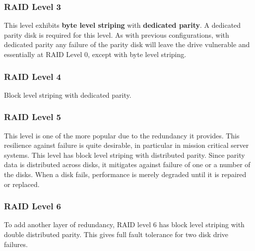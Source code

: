\documentclass[10pt,a4paper]{article}
\begin{document}
\subsubsection{RAID Level 3}
This level exhibits {\bf byte level striping} with {\bf dedicated parity}. A dedicated parity disk is required for this level. As with previous configurations, with dedicated parity any failure of the parity disk will leave the drive vulnerable and essentially at RAID Level 0, except with byte level striping. 
\subsubsection{RAID Level 4}
Block level striping with dedicated parity.  
\subsubsection{RAID Level 5}
This level is one of the more popular due to the redundancy it provides. This resilience against failure is quite desirable, in particular in mission critical server systems. This level has block level striping with distributed parity. Since parity data is distributed across disks, it mitigates against failure of one or a number of the disks. When a disk fails, performance is merely degraded until it is repaired or replaced. 
\subsubsection{RAID Level 6}
To add another layer of redundancy, RAID level 6 has block level striping with double distributed parity. This gives full fault tolerance for two disk drive failures.
\end{document}
